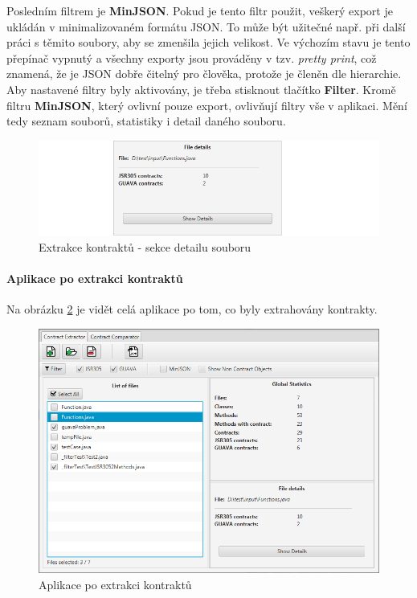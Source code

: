 			Posledním filtrem je \textbf{MinJSON}. Pokud je tento filtr použit, veškerý export je ukládán v minimalizovaném formátu JSON. To může být užitečné např. při další práci s těmito soubory, aby se zmenšila jejich velikost. Ve výchozím stavu je tento přepínač vypnutý a všechny exporty jsou prováděny v tzv. \emph{pretty print}, což znamená, že je JSON dobře čitelný pro člověka, protože je členěn dle hierarchie.\\
			
			Aby nastavené filtry byly aktivovány, je třeba stisknout tlačítko \textbf{Filter}. Kromě filtru \textbf{MinJSON}, který ovlivní pouze export, ovlivňují filtry vše v aplikaci. Mění tedy seznam souborů, statistiky i detail daného souboru.
			
			\begin{figure}[!htb]
					\centering
					\includegraphics[width=1\textwidth]{img/guide04.png}
					\caption[guide04]{Extrakce kontraktů - sekce detailu souboru}
					\label{guide04}
				\endminipage\hfill
			\end{figure}
			
				\paragraph{Aplikace po extrakci kontraktů}
					Na obrázku \ref{guide09} je vidět celá aplikace po tom, co byly extrahovány kontrakty.
					
			\begin{figure}[!htb]
					\centering
					\includegraphics[width=1\textwidth]{img/guide09.png}
					\caption[guide09]{Aplikace po extrakci kontraktů}
					\label{guide09}
				\endminipage\hfill
			\end{figure}					
			
